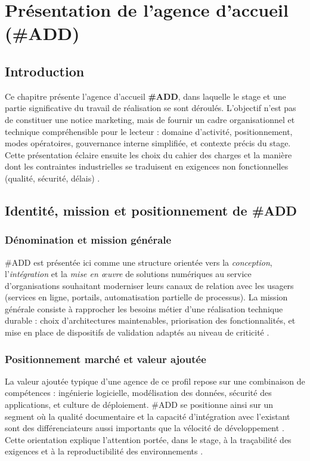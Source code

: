 \chapter{Présentation de l'agence d'accueil (\#ADD)}
\label{chap:agence}

\section{Introduction}

Ce chapitre présente l'agence d'accueil \textbf{\#ADD}, dans laquelle le stage et une partie significative du travail de réalisation se sont déroulés. L'objectif n'est pas de constituer une notice marketing, mais de fournir un cadre organisationnel et technique compréhensible pour le lecteur : domaine d'activité, positionnement, modes opératoires, gouvernance interne simplifiée, et contexte précis du stage. Cette présentation éclaire ensuite les choix du cahier des charges et la manière dont les contraintes industrielles se traduisent en exigences non fonctionnelles (qualité, sécurité, délais) \cite{sommerville2016,pressman2014}.

\section{Identité, mission et positionnement de \#ADD}

\subsection{Dénomination et mission générale}

\#ADD est présentée ici comme une structure orientée vers la \emph{conception}, l'\emph{intégration} et la \emph{mise en œuvre} de solutions numériques au service d'organisations souhaitant moderniser leurs canaux de relation avec les usagers (services en ligne, portails, automatisation partielle de processus). La mission générale consiste à rapprocher les besoins métier d'une réalisation technique durable : choix d'architectures maintenables, priorisation des fonctionnalités, et mise en place de dispositifs de validation adaptés au niveau de criticité \cite{bass2021}.

\subsection{Positionnement marché et valeur ajoutée}

La valeur ajoutée typique d'une agence de ce profil repose sur une combinaison de compétences : ingénierie logicielle, modélisation des données, sécurité des applications, et culture de déploiement. \#ADD se positionne ainsi sur un segment où la qualité documentaire et la capacité d'intégration avec l'existant sont des différenciateurs aussi importants que la vélocité de développement \cite{fowler2002}. Cette orientation explique l'attention portée, dans le stage, à la traçabilité des exigences et à la reproductibilité des environnements \cite{dockerdoc,twelvefactor}.

